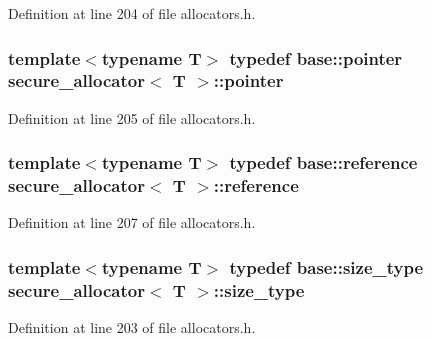 Definition at line 204 of file allocators.\+h.

\hypertarget{structsecure__allocator_a71b267e8d1667eacf8c3505cce785aea}{}
\subsubsection[{pointer}]{\setlength{\rightskip}{0pt plus 5cm}template$<$typename T$>$ typedef base\+::pointer {\bf secure\+\_\+allocator}$<$ T $>$\+::{\bf pointer}}\label{structsecure__allocator_a71b267e8d1667eacf8c3505cce785aea}


Definition at line 205 of file allocators.\+h.

\hypertarget{structsecure__allocator_a6d85bb5fed183fb2304b8403a8843eb4}{}
\subsubsection[{reference}]{\setlength{\rightskip}{0pt plus 5cm}template$<$typename T$>$ typedef base\+::reference {\bf secure\+\_\+allocator}$<$ T $>$\+::{\bf reference}}\label{structsecure__allocator_a6d85bb5fed183fb2304b8403a8843eb4}


Definition at line 207 of file allocators.\+h.

\hypertarget{structsecure__allocator_aa9db67804b069d61983213bded98c08f}{}
\subsubsection[{size\+\_\+type}]{\setlength{\rightskip}{0pt plus 5cm}template$<$typename T$>$ typedef base\+::size\+\_\+type {\bf secure\+\_\+allocator}$<$ T $>$\+::{\bf size\+\_\+type}}\label{structsecure__allocator_aa9db67804b069d61983213bded98c08f}


Definition at line 203 of file allocators.\+h.

\hypertarget{structsecure__allocator_a344198c1316ccf0a1b58ce9c0de7c012}{}
